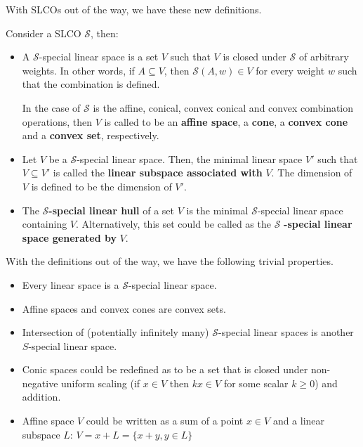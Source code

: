 With SLCOs out of the way, we have these new definitions.

\begin{definition}
  Consider a SLCO \( \mathcal{S} \), then:
  \begin{itemize}
    \item A \( \mathcal{S} \)-special linear space is a set \( V \) such that \( V \) is
      closed under \( \mathcal{S} \) of arbitrary weights. In other words, if \(
      A \subseteq V \), then \( \mathcal{S}(A, w) \in V \) for every weight \( w
      \) such that the combination is defined.

      In the case of \( \mathcal{S} \) is the affine, conical, convex conical
      and convex combination operations, then \( V \) is called to be an
      \textbf{affine space}, a \textbf{cone}, a \textbf{convex cone} and a
      \textbf{convex set}, respectively.

    \item Let \( V \) be a \( \mathcal{S} \)-special linear space. Then, the
      minimal linear space \( V' \) such that \( V \subseteq V' \) is called the
      \textbf{linear subspace associated with} \( V \). The dimension of \( V \)
      is defined to be the dimension of \( V' \).

    \item The \( \mathcal{S} \)\textbf{-special linear hull} of a set \( V \) is the
      minimal \( \mathcal{S} \)-special linear space containing \( V \).
      Alternatively, this set could be called as the \( \mathcal{S} \)
      \textbf{-special linear space generated by} \( V \).
\end{itemize}
\end{definition}

With the definitions out of the way, we have the following trivial properties.

\begin{itemize}
  \item Every linear space is a \( \mathcal{S} \)-special linear space.
  \item Affine spaces and convex cones are convex sets.
  \item Intersection of (potentially infinitely many) \( \mathcal{S} \)-special
    linear spaces is another \( S \)-special linear space.
  \item Conic spaces could be redefined as to be a set that is  closed under
    non-negative uniform scaling (if \( x \in
    V\) then \( kx \in V \) for some scalar \( k \ge 0 \)) and addition.
  \item Affine space \( V \) could be written as a sum of a point \( x \in V \)
    and a linear subspace \( L \): \( V = x + L = \{x + y, y \in L\}   \)
\end{itemize}

